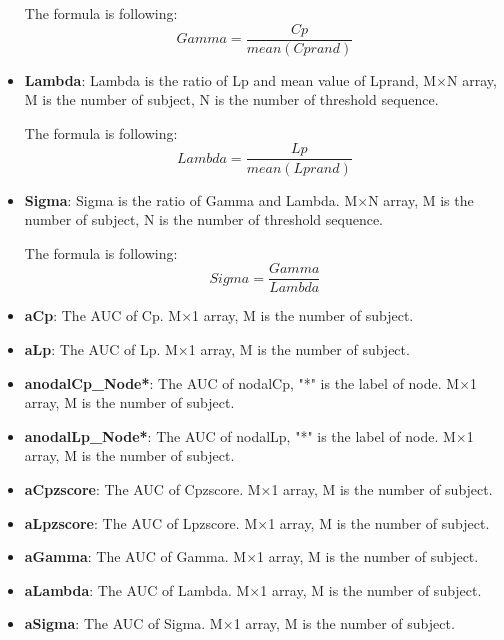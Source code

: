 \documentclass[11pt]{article}
\begin{document}
\begin{itemize}
						The formula is following:
						$$Gamma=\frac{Cp}{mean(Cprand)}$$
					\item \textbf{Lambda}: Lambda is the ratio of Lp and mean value of Lprand,
						M$\times$N array, M is the number of subject, N is the number of threshold sequence.
						
						The formula is following:
						$$Lambda=\frac{Lp}{mean(Lprand)}$$
					\item \textbf{Sigma}: Sigma is the ratio of Gamma and Lambda.
						M$\times$N array, M is the number of subject, N is the number of threshold sequence.
						
						The formula is following:
						$$Sigma=\frac{Gamma}{Lambda}$$
					\item \textbf{aCp}: The AUC of Cp.
						M$\times$1 array, M is the number of subject.
					\item \textbf{aLp}: The AUC of Lp.
						M$\times$1 array, M is the number of subject.
					\item \textbf{anodalCp\_Node*}: The AUC of nodalCp, "*" is the label of node.
						M$\times$1 array, M is the number of subject.
					\item \textbf{anodalLp\_Node*}: The AUC of nodalLp, "*" is the label of node.
						M$\times$1 array, M is the number of subject.
					\item \textbf{aCpzscore}: The AUC of Cpzscore.
						M$\times$1 array, M is the number of subject.
					\item \textbf{aLpzscore}: The AUC of Lpzscore.
						M$\times$1 array, M is the number of subject.
					\item \textbf{aGamma}: The AUC of Gamma.
						M$\times$1 array, M is the number of subject.
					\item \textbf{aLambda}: The AUC of Lambda.
						M$\times$1 array, M is the number of subject.
					\item \textbf{aSigma}: The AUC of Sigma.
						M$\times$1 array, M is the number of subject.
				\end{itemize}
\end{document}
